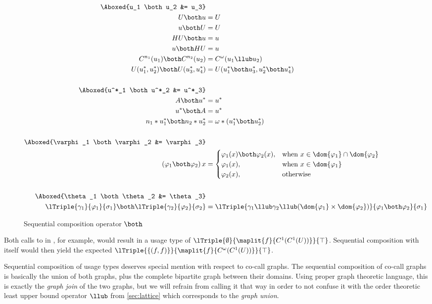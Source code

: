\begin{figure}
\begin{alignat*}{1}
  \Aboxed{u_1 \both u_2 &= u_3} \\
  U \both u  &= U \\
  u \both U  &= U \\
  HU \both u &= u \\
  u \both HU &= u \\
  C^{n_1}(u_1) \both C^{n_2}(u_2) &= C^{\omega}(u_1 \llub u_2) \\
  U(u^*_1, u^*_2) \both U(u^*_3, u^*_4) &= U(u^*_1 \both u^*_3, u^*_2 \both u^*_4) \\
  &\\
  \Aboxed{u^*_1 \both u^*_2 &= u^*_3} \\
  A \both u^* &= u^* \\
  u^* \both A &= u^* \\ 
  n_1*u^*_1 \both n_2*u^*_2 &= \omega * (u^*_1 \both u^*_2) \\
  &\\
  \Aboxed{\varphi_1 \both \varphi_2 &= \varphi_3} \\
  (\varphi_1 \both \varphi_2)\,x &= \begin{cases}
    \varphi_1(x) \both \varphi_2(x),&\text{when } x \in \dom{\varphi_1} \cap \dom{\varphi_2} \\
    \varphi_1(x),&\text{when } x \in \dom{\varphi_1} \\
    \varphi_2(x),&\text{otherwise}
  \end{cases} \\
  &\\
  \Aboxed{\theta_1 \both \theta_2 &= \theta_3} \\
  \lTriple{\gamma_1}{\varphi_1}{\sigma_1} \both \lTriple{\gamma_2}{\varphi_2}{\sigma_2} &= \lTriple{\gamma_1 \llub \gamma_2 \llub (\dom{\varphi_1} \times \dom{\varphi_2})}{\varphi_1 \both \varphi_2}{\sigma_1} \\
\end{alignat*}
\caption{Sequential composition operator $\both$}
\label{fig:both}
\end{figure}

Both calls to  in , for example, would result in a usage type of $\lTriple{\emptyset}{\maplit{f}{C^1(C^1(U))}}{\top}$. 
Sequential composition with itself would then yield the expected $\lTriple{\left\{(f,f)\right\}}{\maplit{f}{C^\omega(C^1(U))}}{\top}$.

Sequential composition of usage types deserves special mention with respect to co-call graphs.
The sequential composition of co-call graphs is basically the union of both graphs, plus the complete bipartite graph between their domains.
Using proper graph theoretic language, this is exactly the \emph{graph join} of the two graphs, but we will refrain from calling it that way in order to not confuse it with the order theoretic least upper bound operator $\llub$ from \cref{sec:lattice} which corresponds to the \emph{graph union}.

